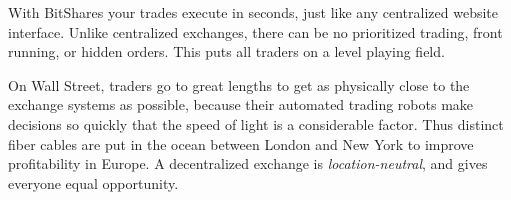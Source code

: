 With BitShares your trades execute in seconds, just like any centralized
website interface. Unlike centralized exchanges, there can be no prioritized
trading, front running, or hidden orders. This puts all traders on a level
playing field.

On Wall Street, traders go to great lengths to get as physically close to the
exchange systems as possible, because their automated trading robots make
decisions so quickly that the speed of light is a considerable factor. Thus
distinct fiber cables are put in the ocean between London and New York to
improve profitability in Europe. A decentralized exchange is
\emph{location-neutral}, and gives everyone equal opportunity.
